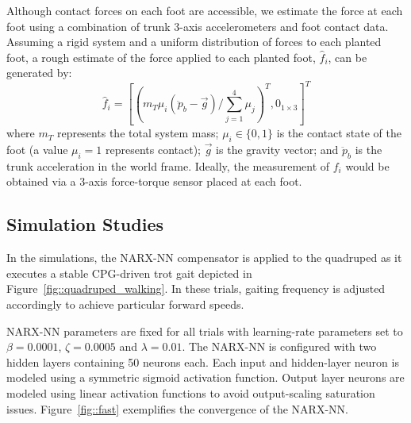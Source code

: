 Although contact forces on each foot are accessible, we estimate the force at each foot using a combination of trunk 3-axis accelerometers and foot contact data. Assuming a rigid system and a uniform distribution of forces to each planted foot, a rough estimate of the force applied to each \Ith planted foot, $\hat{f}_{i}$, can be generated by:
	\vspace{-2mm}
	\begin{equation}
		\hat{f}_{i} = \left[
			\left( {m_{T}\mu_{i}} \left(\ddot{p}_{b} - \vec{g}\right)/{\sum_{j=1}^{4}{\mu_{j}}} \right)^{T},
			0_{1\times3}
		\right]^{T}
	\end{equation}
where $m_{T}$ represents the total system mass; $\mu_{i}\in \{0,1\}$ is the contact state of the \Ith foot (a value $\mu_{i}=1$ represents contact); $\vec{g}$ is the gravity vector; and $\ddot{p}_{b}$ is the trunk acceleration in the world frame. Ideally, the measurement of ${f}_{i}$ would be obtained via a 3-axis force-torque sensor placed at each foot.


\subsection{Simulation Studies}


In the simulations, the \mbox{NARX-NN} compensator is applied to the quadruped as it executes a stable CPG-driven trot gait depicted in  Figure~\ref{fig::quadruped_walking}. In these trials, gaiting frequency is adjusted accordingly to achieve particular forward speeds.

\mbox{NARX-NN} parameters are fixed for all trials with learning-rate  parameters set to $\beta=0.0001$, $\zeta=0.0005$ and $\lambda = 0.01$. The \mbox{NARX-NN} is configured with two hidden layers containing 50 neurons each. Each input and hidden-layer neuron is modeled using a symmetric sigmoid activation function. Output layer neurons are modeled using linear activation functions to avoid output-scaling saturation issues. Figure~\ref{fig::fast} exemplifies the convergence of the \mbox{NARX-NN}. %

